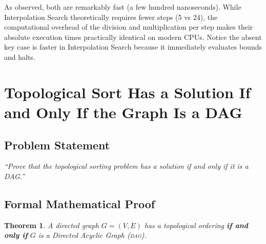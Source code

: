 \documentclass[12pt,a4paper]{article}
\theoremstyle{plain}
\newtheorem{theorem}{Theorem}[section]
\theoremstyle{definition}
\theoremstyle{remark}
\newcommand{\DAG}{\textsc{dag}}
\begin{document}
As observed, both are remarkably fast (a few hundred nanoseconds). While Interpolation Search theoretically requires fewer steps (5 vs 24), the computational overhead of the division and multiplication per step makes their absolute execution times practically identical on modern CPUs. Notice the absent key case is faster in Interpolation Search because it immediately evaluates bounds and halts.

\newpage
\section{Topological Sort Has a Solution If and Only If the Graph Is a DAG}

\subsection{Problem Statement}

\begin{infobox}
\textit{``Prove that the topological sorting problem has a solution
if and only if it is a DAG.''}
\end{infobox}

\subsection{Formal Mathematical Proof}

\begin{theorem}
A directed graph $G = (V, E)$ has a topological ordering \textbf{if and
only if} $G$ is a Directed Acyclic Graph (\DAG).
\end{theorem}
\end{document}

